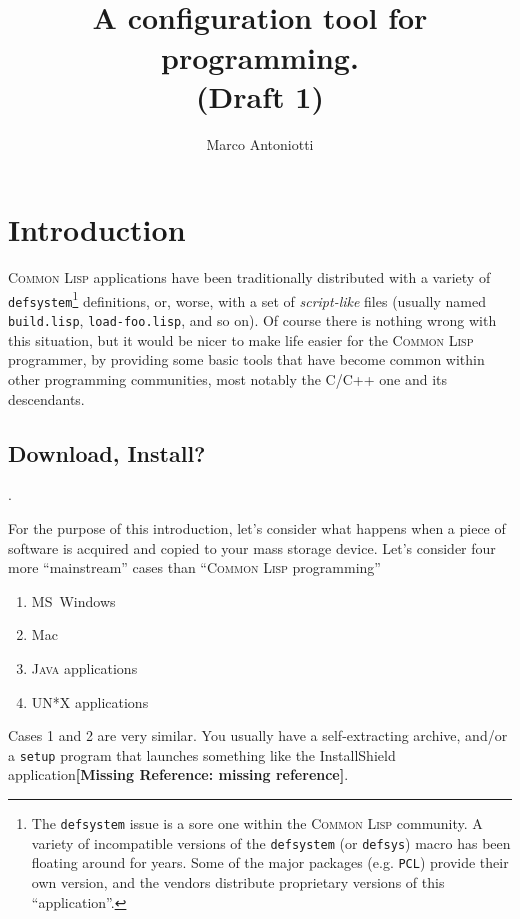 \documentclass{article}
\title{
\DEFCONFIGURATION{}\\
{\normalsize A configuration tool for \CL{} programming.}\\
(Draft 1)
}
\author{Marco Antoniotti}
\newcommand{\CL}{\textsc{Common Lisp}}
\newcommand{\Java}{\textsc{Java}}
\newcommand{\checkref}[1]{{\textbf{[Missing Reference: #1]}}}
\newcommand{\code}[1]{\texttt{#1}}
\begin{document}


\maketitle

\section{Introduction}

\CL{} applications have been traditionally distributed with a variety
of \texttt{defsystem}\footnote{The \texttt{defsystem} issue is a sore
one within the \CL{} community.  A variety of incompatible versions of
the \code{defsystem} (or \texttt{defsys}) macro has been floating
around for years. Some of the major packages (e.g. \texttt{PCL})
provide their own version, and the vendors distribute proprietary
versions of this ``application''.} definitions, or, worse, with a set
of \emph{script-like} files (usually named \texttt{build.lisp},
\texttt{load-foo.lisp}, and so on).  Of course there is nothing wrong
with this situation, but it would be nicer to make life easier for the
\CL{} programmer, by providing some basic tools that have become
common within other programming communities, most notably the C/C++
one and its descendants.

\subsection{Download, Install?}.

For the purpose of this introduction, let's consider what happens when
a piece of software is acquired and copied to your mass storage
device. Let's consider four more ``mainstream'' cases than ``\CL{}
programming''
\begin{enumerate}
\item	MS~Windows
\item	Mac
\item	\Java{} applications
\item	UN*X applications
\end{enumerate}

Cases 1 and 2 are very similar.  You usually have a self-extracting
archive, and/or a \texttt{setup} program that launches something like
the \textsf{InstallShield} application\checkref{missing reference}.
\end{document}
